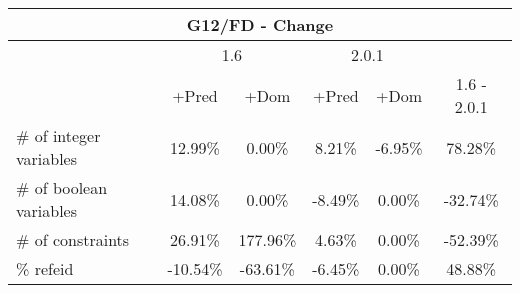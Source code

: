 \documentclass{standalone}
\begin{document}
\begin{table}[H]
\footnotesize
\begin{tabular}{lc|c|c|c|c}
\multicolumn{6}{c}{G12/FD - Change} \\ 
\hline\hline  & \multicolumn{2}{c|}{1.6} &\multicolumn{2}{c|}{2.0.1} &\\ 
\hline  & +Pred & +Dom & +Pred & +Dom & 1.6 - 2.0.1\\
\# of integer variables & 12.99\% & 0.00\% & 8.21\% & -6.95\% & 78.28\% \\ 
\# of boolean variables & 14.08\% & 0.00\% & -8.49\% & 0.00\% & -32.74\% \\ 
\# of constraints       & 26.91\% & 177.96\% & 4.63\% & 0.00\% & -52.39\% \\ 
\% refeid               & -10.54\% & -63.61\% & -6.45\% & 0.00\% & 48.88\%\\ 
\end{tabular} 
\end{table}
\end{document}
